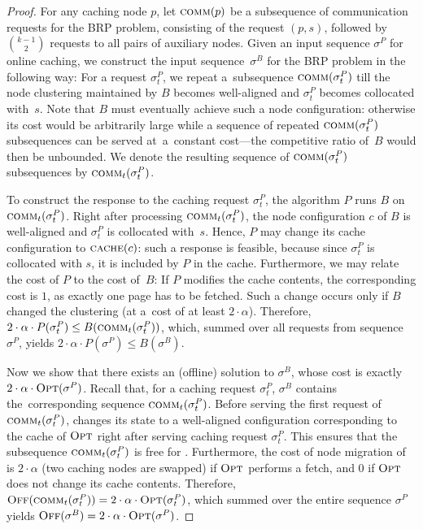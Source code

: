 \begin{proof}
For any caching node $p$, let $\textsc{comm}(p)$ be a subsequence of communication
requests for the BRP problem, consisting of the request $(p, s)$, followed by
$\binom{k-1}{2}$ requests to all pairs of auxiliary nodes. Given an input
sequence $\sigma^P$ for online caching, we construct the input sequence~$\sigma^B$ for the BRP problem in the following way: For a request
$\sigma^P_t$, we repeat a~subsequence $\textsc{comm}(\sigma^P_t)$ till the node
clustering maintained by $B$ becomes well-aligned and $\sigma^P_t$ becomes
collocated with~$s$. Note that $B$ must eventually achieve such a node
configuration: otherwise its cost would be arbitrarily large while a sequence
of repeated $\textsc{comm}(\sigma^P_t)$ subsequences can be served at~a~constant
cost---the competitive ratio of~$B$ would then be unbounded. We denote the
resulting sequence of $\textsc{comm}(\sigma^P_t)$ subsequences by
$\textsc{comm}_t(\sigma^P_t)$.

To construct the response to the caching request $\sigma^P_t$, the algorithm
$P$ runs $B$ on $\textsc{comm}_t(\sigma^P_t)$. Right after processing
$\textsc{comm}_t(\sigma^P_t)$, the node configuration $c$ of $B$ is well-aligned and
$\sigma^P_t$ is collocated with~$s$. Hence, $P$ may change its cache
configuration to $\textsc{cache}(c)$: such a response is feasible, because
since $\sigma^P_t$ is collocated with $s$, it is included by $P$ in the cache.
Furthermore, we may relate the cost of $P$ to the cost of~$B$: If $P$ modifies
the cache contents, the corresponding cost is $1$, as exactly one page has to
be fetched. Such a change occurs only if $B$ changed the clustering 
(at a~cost of at least $2 \cdot \alpha$). Therefore, $2
\cdot \alpha \cdot P(\sigma^P_t) \leq B(\textsc{comm}_t(\sigma^P_t))$, which,
summed over all requests from sequence $\sigma^P$, yields $2 \cdot
\alpha \cdot P(\sigma^P) \leq B(\sigma^B)$.

Now we show that there exists an (offline) solution \OFF to $\sigma^B$, whose
cost is exactly ${2 \cdot \alpha \cdot \textsc{Opt}(\sigma^P)}$. Recall that, for a
caching request $\sigma^P_t$, $\sigma^B$ contains the~corresponding sequence
$\textsc{comm}_t(\sigma^P_t)$. Before serving the first request
of~$\textsc{comm}_t(\sigma^P_t)$, \OFF changes its state to a well-aligned
configuration corresponding to the cache of $\textsc{Opt}$ right after serving caching 
request $\sigma^P_t$. This ensures that the subsequence $\textsc{comm}_t(\sigma^P_t)$
is free for \OFF. Furthermore, the cost of node migration of \OFF is $2 \cdot
\alpha$ (two caching nodes are swapped) if $\textsc{Opt}$ performs a fetch, and 0 if
$\textsc{Opt}$ does not change its cache contents. Therefore,
$\textsc{Off}(\textsc{comm}_t(\sigma^P_t)) = 2 \cdot \alpha \cdot \textsc{Opt}(\sigma^P_t)$, which
summed over the entire sequence $\sigma^P$ yields $\textsc{Off}(\sigma^B) = 2 \cdot
\alpha \cdot \textsc{Opt}(\sigma^P)$.


\end{proof}
